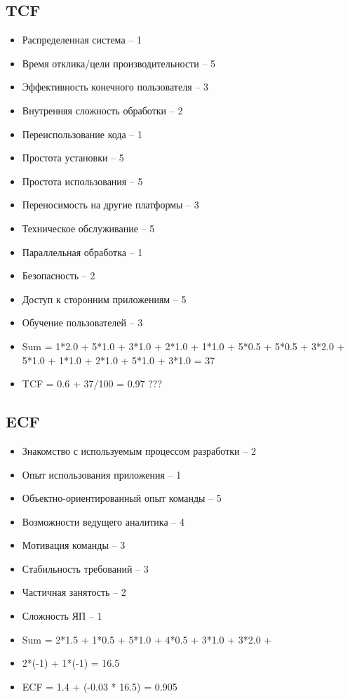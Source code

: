 \documentclass{article}
\begin{document}
\subsection*{TCF}
\begin{itemize}
    \item Распределенная система -- 1
\item Время отклика/цели производительности  -- 5
\item Эффективность конечного пользователя -- 3
\item Внутренняя сложность обработки -- 2
\item Переиспользование кода -- 1 
\item Простота установки -- 5
\item Простота использования -- 5
\item Переносимость на другие платформы -- 3
\item Техническое обслуживание -- 5
\item Параллельная обработка  -- 1
\item Безопасность -- 2
\item Доступ к сторонним приложениям  -- 5
\item Обучение пользователей -- 3
\item Sum = 1*2.0 + 5*1.0 + 3*1.0 + 2*1.0 + 1*1.0 + 5*0.5 + 5*0.5 + 3*2.0 + 5*1.0 + 1*1.0 + 2*1.0 + 5*1.0 + 3*1.0 = 37 
\item TCF =  0.6 + 37/100 = 0.97 ???
\end{itemize}

\subsection*{ECF}
\begin{itemize}
\item Знакомство с используемым процессом разработки -- 2
\item Опыт использования приложения -- 1
\item Объектно-ориентированный опыт команды -- 5
\item Возможности ведущего аналитика -- 4
\item Мотивация команды -- 3
\item Стабильность требований -- 3
\item Частичная занятость -- 2
\item Сложность ЯП -- 1
\item Sum = 2*1.5 + 1*0.5 + 5*1.0 + 4*0.5 + 3*1.0 + 3*2.0 + \item 2*(-1) + 1*(-1) = 16.5
\item ECF = 1.4 + (-0.03 * 16.5) = 0.905
\end{itemize}
\end{document}
